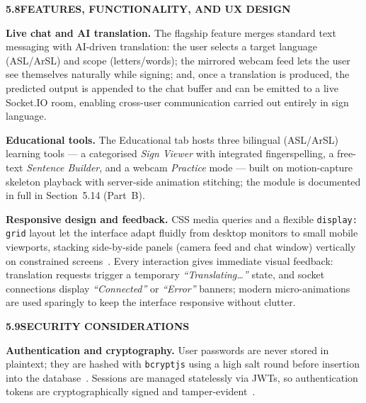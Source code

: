 \noindent\textbf{5.8\quad FEATURES, FUNCTIONALITY, AND UX DESIGN}\par
{}
\vspace{0.1cm}

\noindent\textbf{Live chat and AI translation.} The flagship feature merges standard text messaging with AI-driven translation: the user selects a target language (ASL/ArSL) and scope (letters/words); the mirrored webcam feed lets the user see themselves naturally while signing; and, once a translation is produced, the predicted output is appended to the chat buffer and can be emitted to a live Socket.IO room, enabling cross-user communication carried out entirely in sign language.\par\vspace{0.1cm}

\noindent\textbf{Educational tools.} The Educational tab hosts three bilingual (ASL/ArSL) learning tools --- a categorised \textit{Sign Viewer} with integrated fingerspelling, a free-text \textit{Sentence Builder}, and a webcam \textit{Practice} mode --- built on motion-capture skeleton playback with server-side animation stitching; the module is documented in full in Section~5.14 (Part~B).\par\vspace{0.1cm}

\noindent\textbf{Responsive design and feedback.} CSS media queries and a flexible \texttt{display: grid} layout let the interface adapt fluidly from desktop monitors to small mobile viewports, stacking side-by-side panels (camera feed and chat window) vertically on constrained screens~\cite{wcag22}. Every interaction gives immediate visual feedback: translation requests trigger a temporary \textit{``Translating\ldots''} state, and socket connections display \textit{``Connected''} or \textit{``Error''} banners; modern micro-animations are used sparingly to keep the interface responsive without clutter.\par\vspace{0.3cm}

\noindent\textbf{5.9\quad SECURITY CONSIDERATIONS}\par
{}
\vspace{0.1cm}

\noindent\textbf{Authentication and cryptography.} User passwords are never stored in plaintext; they are hashed with \texttt{bcryptjs} using a high salt round before insertion into the database~\cite{bcrypt2024}. Sessions are managed statelessly via JWTs, so authentication tokens are cryptographically signed and tamper-evident~\cite{rfc7519}.\par\vspace{0.1cm}

